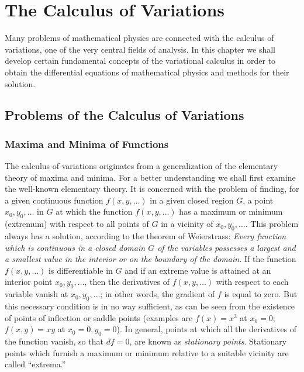 \chapter{The Calculus of Variations}

Many problems of mathematical physics are connected with the calculus of variations, one of the very central fields of analysis. In this chapter we shall develop certain fundamental concepts of the variational calculus in order to obtain the differential equations of mathematical physics and methods for their solution.

\section{Problems of the Calculus of Variations}

\subsection{Maxima and Minima of Functions}
The calculus of variations originates from a generalization of the elementary theory of maxima and minima. For a better understanding we shall first examine the well-known elementary theory. It is concerned with the problem of finding, for a given continuous function $f(x,y,\ldots)$ in a given closed region $G$, a point $x_0,y_0,\ldots$ in $G$ at which the function $f(x,y,\ldots)$ has a maximum or minimum (extremum) with respect to all points of $G$ in a vicinity of $x_0,y_0,\ldots$. This problem always has a solution, according to the theorem of Weierstrass: \emph{Every function which is continuous in a closed domain $G$ of the variables possesses a largest and a smallest value in the interior or on the boundary of the domain.} If the function $f(x,y,\ldots)$ is differentiable in $G$ and if an extreme value is attained at an interior point $x_0,y_0,\ldots$, then the derivatives of $f(x,y,\ldots)$ with respect to each variable vanish at $x_0,y_0,\ldots$; in other words, the gradient of $f$ is equal to zero. But this necessary condition is in no way sufficient, as can be seen from the existence of points of inflection or saddle points (examples are $f(x)=x^3$ at $x_0=0$; $f(x,y)=xy$ at $x_0=0,y_0=0$). In general, points at which all the derivatives of the function vanish, so that $df=0$, are known as \emph{stationary points}. Stationary points which furnish a maximum or minimum relative to a suitable vicinity are called ``extrema.''

